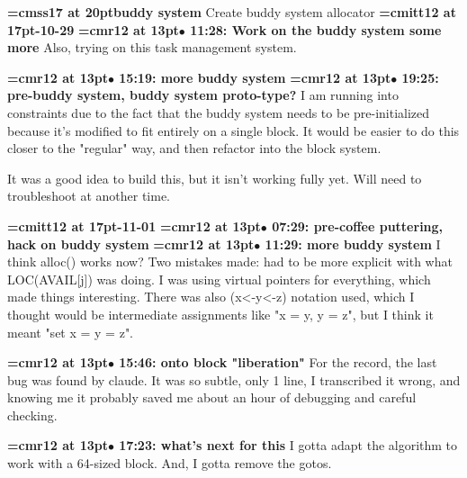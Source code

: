 {\medskip\noindent\bf\font\titlefont=cmss17 at 20pt\titlefont buddy system}\medskip
Create buddy system allocator
{\medskip\noindent\bf\font\titlefont=cmitt12 at 17pt-10-29}\medskip
{\smallskip\noindent\bf\font\titlefont=cmr12 at 13pt\titlefont $\bullet$ 11:28: Work on the buddy system some more}\smallskip
Also, trying on this task management system.
\par

{\smallskip\noindent\bf\font\titlefont=cmr12 at 13pt\titlefont $\bullet$ 15:19: more buddy system}\smallskip
{\smallskip\noindent\bf\font\titlefont=cmr12 at 13pt\titlefont $\bullet$ 19:25: pre-buddy system, buddy system proto-type?}\smallskip
I am running into constraints due to the fact that the buddy system needs to be pre-initialized because it's modified to fit entirely on a single block. It would be easier to do this closer to the "regular" way, and then refactor into the block system.
\par

It was a good idea to build this, but it isn't working fully yet. Will need to troubleshoot at another time.
\par

{\medskip\noindent\bf\font\titlefont=cmitt12 at 17pt-11-01}\medskip
{\smallskip\noindent\bf\font\titlefont=cmr12 at 13pt\titlefont $\bullet$ 07:29: pre-coffee puttering, hack on buddy system}\smallskip
{\smallskip\noindent\bf\font\titlefont=cmr12 at 13pt\titlefont $\bullet$ 11:29: more buddy system}\smallskip
I think alloc() works now? Two mistakes made: had to be more explicit with what LOC(AVAIL[j]) was doing. I was using virtual pointers for everything, which made things interesting. There was also (x<-y<-z) notation used, which I thought would be intermediate assignments like "x = y, y = z", but I think it meant "set x = y = z".
\par

{\smallskip\noindent\bf\font\titlefont=cmr12 at 13pt\titlefont $\bullet$ 15:46: onto block "liberation"}\smallskip
For the record, the last bug was found by claude. It was so subtle, only 1 line, I transcribed it wrong, and knowing me it probably saved me about an hour of debugging and careful checking.
\par

{\smallskip\noindent\bf\font\titlefont=cmr12 at 13pt\titlefont $\bullet$ 17:23: what's next for this}\smallskip
I gotta adapt the algorithm to work with a 64-sized block. And, I gotta remove the gotos.
\par

